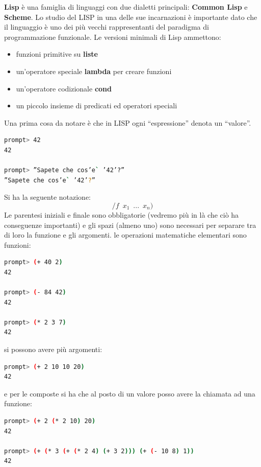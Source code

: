 \documentclass[a4paper,12pt, oneside]{book}
\begin{document}
\textbf{Lisp} è una famiglia di linguaggi con due dialetti principali: \textbf{Common Lisp} e \textbf{Scheme}. Lo studio del LISP in una delle sue incarnazioni è importante dato che il linguaggio è uno dei più vecchi rappresentanti del paradigma di programmazione funzionale. Le versioni minimali di Lisp ammettono:
\begin{itemize}
\item funzioni primitive su \textbf{liste}
\item un'operatore speciale \textbf{lambda} per creare funzioni
\item un'operatore codizionale \textbf{cond}
\item un piccolo insieme di predicati ed operatori speciali
\end{itemize}
Una prima cosa da notare è che in LISP ogni “espressione” denota un
“valore”.
\begin{shaded}
\begin{lstlisting}[language=bash]
prompt> 42
42

prompt> ”Sapete che cos’e` ’42’?”
”Sapete che cos’e` ’42’?”
\end{lstlisting}
\end{shaded} Si ha la seguente notazione:
$$/f\,\,\, x_1\,\,\,...\,\,\, x_n)$$
Le parentesi iniziali e finale sono obbligatorie (vedremo più in là
che ciò ha conseguenze importanti) e gli spazi (almeno uno)
sono necessari per separare tra di loro la funzione e gli argomenti.
le operazioni matematiche elementari sono funzioni:
\begin{shaded}
\begin{lstlisting}[language=bash]
prompt> (+ 40 2)
42

prompt> (- 84 42)
42

prompt> (* 2 3 7)
42
\end{lstlisting}
\end{shaded}
si possono avere più argomenti:
\begin{shaded}
\begin{lstlisting}[language=bash]
prompt> (+ 2 10 10 20)
42
\end{lstlisting}
\end{shaded}
e per le composte si ha che al posto di un valore posso avere la chiamata ad una funzione: 
\begin{shaded}
\begin{lstlisting}[language=bash]
prompt> (+ 2 (* 2 10) 20)
42

prompt> (+ (* 3 (+ (* 2 4) (+ 3 2))) (+ (- 10 8) 1))
42
\end{lstlisting}
\end{shaded}
\end{document}
